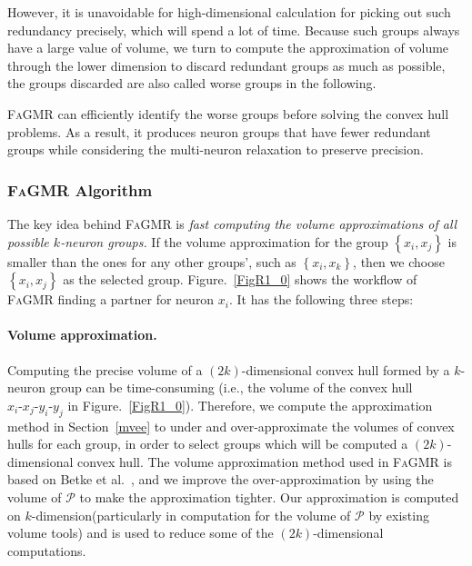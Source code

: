 \documentclass[runningheads]{llncs}
\newcommand{\ourtool}{\textsc{FaGMR}\xspace}
\begin{document}
However, it is unavoidable for high-dimensional calculation for picking out such redundancy precisely, which will spend a lot of time. Because such groups always have a large value of volume, we turn to compute the approximation of volume through the lower dimension to discard redundant groups as much as possible, the groups discarded are also called worse groups in the following.

\ourtool can efficiently identify the worse groups before solving the convex hull problems.
As a result, it produces neuron groups that have fewer redundant groups while considering the multi-neuron relaxation to preserve precision.


%
%
%
\subsubsection{\ourtool Algorithm}
The key idea behind \ourtool is \emph{fast computing the volume approximations of all possible
$k$-neuron groups.}
If the volume approximation for the group $\left\{x_{i},x_{j}\right\}$ is smaller than the ones for 
any other groups', such as $\left\{x_{i},x_{k}\right\}$,
then we choose $\left\{x_{i},x_{j}\right\}$ as the selected group. 
Figure.~\ref{FigR1_0} shows the workflow of \ourtool finding a partner for neuron $x_{i}$.
It has the following three steps:

\paragraph{Volume approximation.}
Computing the precise volume of a $(2k)$-dimensional convex hull
formed by a $k$-neuron group can be time-consuming (i.e., the volume of the convex hull
$x_{i}\text{-}x_{j}\text{-}y_{i}\text{-}y_{j}$ in Figure.~\ref{FigR1_0}). Therefore,
we compute the approximation method in Section~\ref{mvee} to under and over-approximate the volumes
of convex hulls for each group, in order to select groups which will be computed a $(2k)$-dimensional convex hull. The volume approximation method used in \ourtool is based on Betke et al.~\cite{betke1993approximating}, and we improve the over-approximation by using the volume of $\mathcal{P}$ to make the approximation tighter. Our approximation is computed on $k$-dimension(particularly in computation for the volume of $\mathcal{P}$ by existing volume tools) and is used to reduce some of the $(2k)$-dimensional computations.
\end{document}
